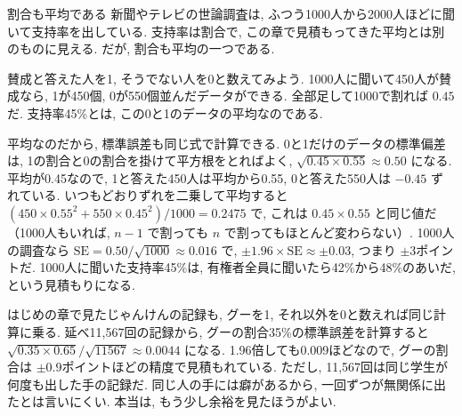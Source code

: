   \begin{mybox}{割合も平均である}
    新聞やテレビの世論調査は, ふつう1000人から2000人ほどに聞いて支持率を出している.
    支持率は割合で, この章で見積もってきた平均とは別のものに見える.
    だが, 割合も平均の一つである.

    賛成と答えた人を1, そうでない人を0と数えてみよう.
    1000人に聞いて450人が賛成なら, 1が450個, 0が550個並んだデータができる.
    全部足して1000で割れば $0.45$ だ.
    支持率45\%とは, この0と1のデータの平均なのである.

    平均なのだから, 標準誤差も同じ式で計算できる.
    0と1だけのデータの標準偏差は, 1の割合と0の割合を掛けて平方根をとればよく, $\sqrt{0.45 \times 0.55} \approx 0.50$ になる.
    平均が0.45なので, 1と答えた450人は平均から0.55, 0と答えた550人は $-0.45$ ずれている.
    いつもどおりずれを二乗して平均すると $(450 \times 0.55^2 + 550 \times 0.45^2)/1000 = 0.2475$ で, これは $0.45 \times 0.55$ と同じ値だ（1000人もいれば, $n-1$ で割っても $n$ で割ってもほとんど変わらない）.
    1000人の調査なら $\mathrm{SE} = 0.50/\sqrt{1000} \approx 0.016$ で, $\pm 1.96 \times \mathrm{SE} \approx \pm 0.03$, つまり $\pm 3$ポイントだ.
    1000人に聞いた支持率45\%は, 有権者全員に聞いたら42\%から48\%のあいだ, という見積もりになる.

    はじめの章で見たじゃんけんの記録も, グーを1, それ以外を0と数えれば同じ計算に乗る.
    延べ11{,}567回の記録から, グーの割合35\%の標準誤差を計算すると $\sqrt{0.35 \times 0.65}/\sqrt{11567} \approx 0.0044$ になる.
    1.96倍しても0.009ほどなので, グーの割合は $\pm 0.9$ポイントほどの精度で見積もれている.
    ただし, 11{,}567回は同じ学生が何度も出した手の記録だ.
    同じ人の手には癖があるから, 一回ずつが無関係に出たとは言いにくい.
    本当は, もう少し余裕を見たほうがよい.
  \end{mybox}

